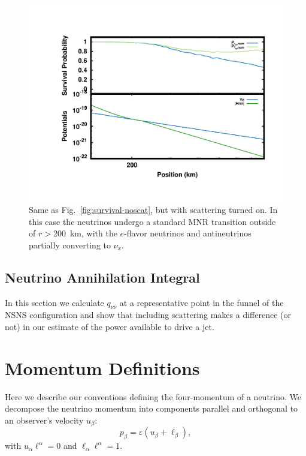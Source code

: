 \documentclass[aps,floatfix,prd,superscriptaddress,twocolumn]{revtex4-1}
\begin{document}
\begin{figure}
  \includegraphics[width=\columnwidth]{fig-survival_prob-scat_nh}
  \caption{Same as Fig.~\ref{fig:survival-noscat},
    but with scattering turned on.
    In this case the neutrinos undergo a standard MNR transition
    outside of $r>200$~km,
    with the $e$-flavor neutrinos and antineutrinos
    partially converting to $\nu_x$.
    }
  \label{fig:survival-scat}
\end{figure}

\subsection{Neutrino Annihilation Integral}
\label{ssec:q_nunu}
In this section we calculate $q_{\nu\bar{\nu}}$ at a representative point
in the funnel of the NSNS configuration and show that including scattering makes
a difference (or not) in our estimate of the power available to drive a jet.

\appendix

\section{Momentum Definitions}
\label{sec:def_momentum}
Here we describe our conventions defining the four-momentum of a neutrino.
We decompose the neutrino momentum into components parallel and orthogonal to
an observer's velocity $u_\beta$:
\begin{equation}
  \label{eqn:def_momentum_2}
  p_\beta = \varepsilon (u_\beta + \ell_\beta),
\end{equation}
with $u_\alpha\ell^\alpha=0$ and $\ell_\alpha\ell^\alpha=1$.
\end{document}
